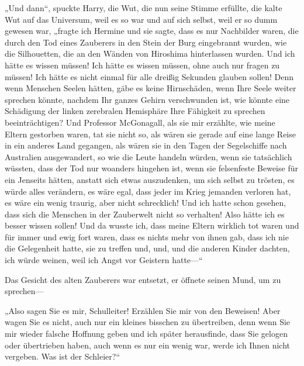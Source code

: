 „Und dann“, spuckte Harry, die Wut, die nun seine Stimme erfüllte, die kalte Wut auf das Universum, weil es so war und auf sich selbst, weil er so dumm gewesen war, „fragte ich Hermine und sie sagte, dass es nur Nachbilder waren, die durch den Tod eines Zauberers in den Stein der Burg eingebrannt wurden, wie die Silhouetten, die an den Wänden von Hiroshima hinterlassen wurden. Und ich hätte es wissen müssen! Ich hätte es wissen müssen, ohne auch nur fragen zu müssen! Ich hätte es nicht einmal für alle dreißig Sekunden glauben sollen! Denn wenn Menschen Seelen hätten, gäbe es keine Hirnschäden, wenn Ihre Seele weiter sprechen könnte, nachdem Ihr ganzes Gehirn verschwunden ist, wie könnte eine Schädigung der linken zerebralen Hemisphäre Ihre Fähigkeit zu sprechen beeinträchtigen? Und Professor McGonagall, als sie mir erzählte, wie meine Eltern gestorben waren, tat sie nicht so, als wären sie gerade auf eine lange Reise in ein anderes Land gegangen, als wären sie in den Tagen der Segelschiffe nach Australien ausgewandert, so wie die Leute handeln würden, wenn sie tatsächlich wüssten, dass der Tod nur woanders hingehen ist, wenn sie felsenfeste Beweise für ein Jenseits hätten, anstatt sich etwas auszudenken, um sich selbst zu trösten, es würde alles verändern, es wäre egal, dass jeder im Krieg jemanden verloren hat, es wäre ein wenig traurig, aber nicht schrecklich! Und ich hatte schon gesehen, dass sich die Menschen in der Zauberwelt nicht so verhalten! Also hätte ich es besser wissen sollen! Und da wusste ich, dass meine Eltern wirklich tot waren und für immer und ewig fort waren, dass es nichts mehr von ihnen gab, dass ich nie die Gelegenheit hatte, sie zu treffen und, und, und die anderen Kinder dachten, ich würde weinen, weil ich Angst vor Geistern hatte—“

Das Gesicht des alten Zauberers war entsetzt, er öffnete seinen Mund, um zu sprechen—

„Also sagen Sie es mir, Schulleiter! Erzählen Sie mir von den Beweisen! Aber wagen Sie es nicht, auch nur ein kleines bisschen zu übertreiben, denn wenn Sie mir wieder falsche Hoffnung geben und ich später herausfinde, dass Sie gelogen oder übertrieben haben, auch wenn es nur ein wenig war, werde ich Ihnen nicht vergeben. Was ist der Schleier?“

